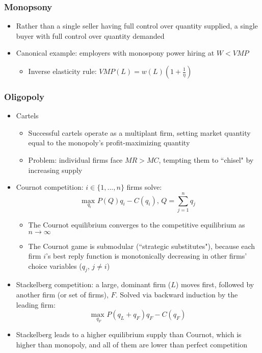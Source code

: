 \documentclass{article}
\newcommand{\usmax}[1]{\underset{#1}{\text{max }}}
\begin{document}
\subsubsection{Monopsony}
\begin{itemize}
	\item Rather than a single seller having full control over quantity supplied, a single buyer with full control over quantity demanded 
	\item Canonical example: employers with monospony power hiring at $W<VMP$
		\begin{itemize}
			\item Inverse elasticity rule: $VMP(L) = w(L)\left(1 + \frac{1}{\eta}\right)$
		\end{itemize}
\end{itemize}

\subsubsection{Oligopoly}
\begin{itemize}
	\item Cartels
		\begin{itemize}
			\item Successful cartels operate as a multiplant firm, setting market quantity equal to the monopoly's profit-maximizing quantity
			\item Problem: individual firms face $MR>MC$, tempting them to ``chisel" by increasing supply
		\end{itemize}
	\item Cournot competition: $i\in\{1,...,n\}$ firms solve:
		\[
			\usmax{q_i}P(Q)q_i-C(q_i)\text{, }Q=\sum_{j=1}^nq_j
		\]
		\begin{itemize}
			\item The Cournot equilibrium converges to the competitive equilibrium as $n\rightarrow\infty$
			\item The Cournot game is submodular (``strategic substitutes"), because each firm $i$'s best reply function is monotonically decreasing in other firms' choice variables ($q_j$, $j\neq i$)
		\end{itemize}
	\item Stackelberg competition: a large, dominant firm ($L$) moves first, followed by another firm (or set of firms), $F$. Solved via backward induction by the leading firm:
		\[
			\usmax{q_F}P(q_L+q_F)q_F-C(q_F)
		\]
	\item Stackelberg leads to a higher equilibrium supply than Cournot, which is higher than monopoly, and all of them are lower than perfect competition
\end{itemize}
\end{document}

